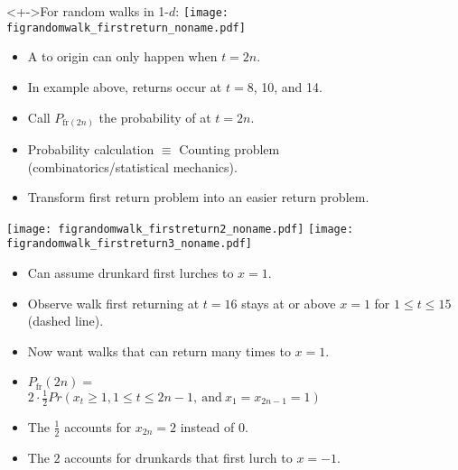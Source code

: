 \begin{frame}

  \begin{block}<+->{For random walks in 1-$d$:}
    \texttt{[image: figrandomwalk\_firstreturn\_noname.pdf]}
    \begin{itemize}
    \item<+->
      A  to origin can only happen when $t = 2n$.
    \item<+->
      In example above, returns occur at $t=8$, 10, and 14.
    \item<+->
      Call $P_{\textrm{fr}(2n)}$ the probability of  at $t=2n$.
    \item<+-> 
      Probability calculation $\equiv$ Counting problem \\
      (combinatorics/statistical mechanics).
    \item<+->
       Transform first return problem into an easier return problem.
    \end{itemize}
  \end{block}

\end{frame}


\begin{frame}
  \small

  \begin{block}{}
    \begin{overprint}
      \texttt{[image: figrandomwalk\_firstreturn2\_noname.pdf]}%
      \texttt{[image: figrandomwalk\_firstreturn3\_noname.pdf]}
    \end{overprint}
    \begin{itemize}
    \item<+->
      Can assume drunkard first lurches to $x=1$.
    \item<+-> 
      Observe walk first returning at $t=16$ stays at or above $x=1$ for $1 \le t \le 15$
      (dashed  line).
    \item<+-> 
      Now want walks that can return many times to $x=1$.
    \item<+-> 
      $P_{\textrm{fr}}(2n) = $ \\
      $2\cdot\frac{1}{2}Pr(x_{t} \ge 1, 1 \le t \le 2n-1, \ \mbox{and} \  x_1 = x_{2n-1} = 1) $
    \item<+-> 
      The $\frac{1}{2}$ accounts for $x_{2n}=2$ instead of 0.
    \item<+-> 
      The $2$ accounts for drunkards that first lurch to $x=-1$.
    \end{itemize}
  \end{block}

\end{frame}

